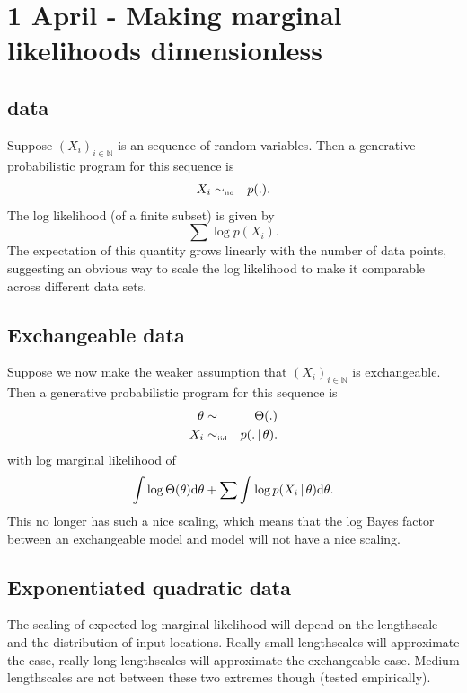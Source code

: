 \documentclass[twoside,11pt]{article}
\begin{document}
\section{1 April - Making marginal likelihoods dimensionless}

\subsection{\iid data}

Suppose $(X_i)_{i\in\mathbb{N}}$ is an \iid sequence of random variables.
Then a generative probabilistic program for this sequence is
\begin{eqnarray}
X_i    & \sim_{\mbox{\tiny iid}} & p(.).
\end{eqnarray}
The log likelihood (of a finite subset) is given by
\begin{equation}
\sum \log p(X_i).
\end{equation}
The expectation of this quantity grows linearly with the number of data points, suggesting an obvious way to scale the log likelihood to make it comparable across different data sets.

\subsection{Exchangeable data}

Suppose we now make the weaker assumption that $(X_i)_{i\in\mathbb{N}}$ is exchangeable.
Then a generative probabilistic program for this sequence is
\begin{eqnarray}
\theta & \sim    & \Theta(.) \\
X_i    & \sim_{\mbox{\tiny iid}} & p(.\,|\,\theta).
\end{eqnarray}
with log marginal likelihood of
\begin{equation}
\int \log\Theta(\theta)\textrm{d}\theta + \sum \int \log p(X_i\,|\,\theta)\textrm{d}\theta.
\end{equation}
This no longer has such a nice scaling, which means that the log Bayes factor between an exchangeable model and \iid model will not have a nice scaling.

\subsection{Exponentiated quadratic data}

The scaling of expected log marginal likelihood will depend on the lengthscale and the distribution of input locations.
Really small lengthscales will approximate the \iid case, really long lengthscales will approximate the exchangeable case.
Medium lengthscales are not between these two extremes though (tested empirically).
\end{document}
